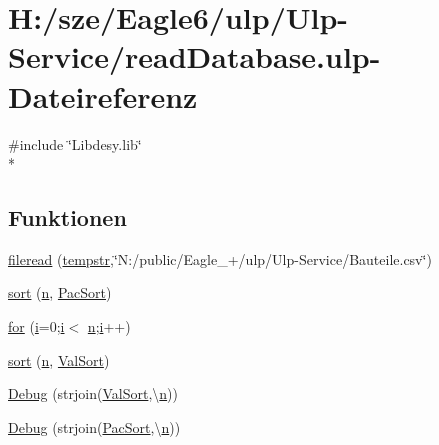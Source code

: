 \hypertarget{read_database_8ulp}{}\section{H\+:/sze/\+Eagle6/ulp/\+Ulp-\/\+Service/read\+Database.ulp-\/\+Dateireferenz}
\label{read_database_8ulp}
{\ttfamily \#include \char`\"{}Libdesy.\+lib\char`\"{}}\\*
\subsection*{Funktionen}
\begin{DoxyCompactItemize}
\item 
\hyperlink{read_database_8ulp_a15e3fa8bc7e4addfd9f4b76201b16461}{fileread} (\hyperlink{readlibs_8ulp_a03ca86bb44d6d953219c512adb218dbb}{tempstr},\char`\"{}N\+:/public/Eagle\+\_+/ulp/Ulp-\/Service/Bauteile.\+csv\char`\"{})
\item 
\hyperlink{read_database_8ulp_a6e943e705f4225188d836da6e1fe94af}{sort} (\hyperlink{read_database_8ulp_a76f11d9a0a47b94f72c2d0e77fb32240}{n}, \hyperlink{read_database_8ulp_a7888d3b2f277351256d2bd32cd3ae937}{Pac\+Sort})
\item 
\hyperlink{read_database_8ulp_a3957b3f51f8c226891bdf834316062cc}{for} (\hyperlink{test_8ulp_acb559820d9ca11295b4500f179ef6392}{i}=0;\hyperlink{test_8ulp_acb559820d9ca11295b4500f179ef6392}{i}$<$ \hyperlink{read_database_8ulp_a76f11d9a0a47b94f72c2d0e77fb32240}{n};\hyperlink{test_8ulp_acb559820d9ca11295b4500f179ef6392}{i}++)
\item 
\hyperlink{read_database_8ulp_ade0c1ac78b71135b12789c37d7f0b35a}{sort} (\hyperlink{read_database_8ulp_a76f11d9a0a47b94f72c2d0e77fb32240}{n}, \hyperlink{read_database_8ulp_a65aca5f1526cff632f5e2860ccd05422}{Val\+Sort})
\item 
\hyperlink{read_database_8ulp_a0a9aff040cf0e31ec62dea60acb9a7aa}{Debug} (strjoin(\hyperlink{read_database_8ulp_a65aca5f1526cff632f5e2860ccd05422}{Val\+Sort},\textquotesingle{}\textbackslash{}\hyperlink{read_database_8ulp_a76f11d9a0a47b94f72c2d0e77fb32240}{n}\textquotesingle{}))
\item 
\hyperlink{read_database_8ulp_a921ddd6584dadbfdea02ba5ff1280320}{Debug} (strjoin(\hyperlink{read_database_8ulp_a7888d3b2f277351256d2bd32cd3ae937}{Pac\+Sort},\textquotesingle{}\textbackslash{}\hyperlink{read_database_8ulp_a76f11d9a0a47b94f72c2d0e77fb32240}{n}\textquotesingle{}))
\end{DoxyCompactItemize}
